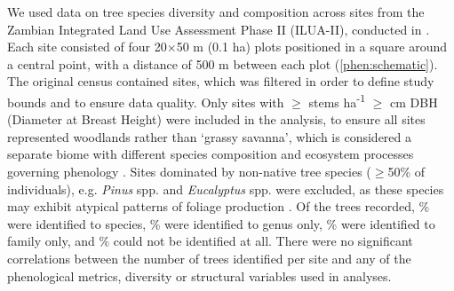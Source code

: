 \begin{refsection}
We used data on tree species diversity and composition across \nSites{} sites from the Zambian Integrated Land Use Assessment Phase II (ILUA-II), conducted in \censusDate{} \citep{Mukosha2009, Pelletier2018}. Each site consisted of four 20$\times$50 m (0.1 ha) plots positioned in a square around a central point, with a distance of 500 m between each plot (\autoref{phen:schematic}). The original census contained \nTotalSites{} sites, which was filtered in order to define study bounds and to ensure data quality. Only sites with $\geq$\treesHa{} stems ha\textsuperscript{-1} $\geq$\stemSize{} cm DBH (Diameter at Breast Height) were included in the analysis, to ensure all sites represented woodlands rather than `grassy savanna', which is considered a separate biome with different species composition and ecosystem processes governing phenology \citep{Parr2014}. Sites dominated by non-native tree species ($\geq$50\% of individuals), e.g. \textit{Pinus} spp. and \textit{Eucalyptus} spp. were excluded, as these species may exhibit atypical patterns of foliage production \citep{Broadhead2003}. Of the \nTrees{} trees recorded, \perSp{}\% were identified to species, \perGen{}\% were identified to genus only, \perFam{}\% were identified to family only, and \perIndet{}\% could not be identified at all. There were no significant correlations between the number of trees identified per site and any of the phenological metrics, diversity or structural variables used in analyses.


\end{refsection}
